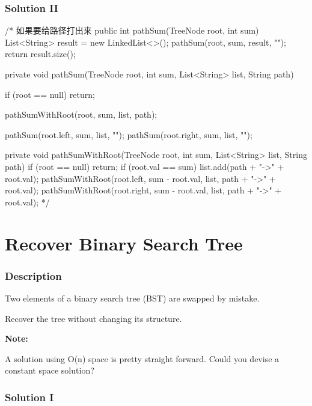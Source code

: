 \newpage

\subsubsection{Solution II}
\begin{Code}
/* 如果要给路径打出来
public int pathSum(TreeNode root, int sum) {
    List<String> result = new LinkedList<>();
    pathSum(root, sum, result, "");
    return result.size();
}

private void pathSum(TreeNode root, int sum, List<String> list, String path) {
    if (root == null) {
        return;
    }

    pathSumWithRoot(root, sum, list, path);

    pathSum(root.left, sum, list, "");
    pathSum(root.right, sum, list, "");
}

private void pathSumWithRoot(TreeNode root, int sum, List<String> list, String path) {
    if (root == null) {
        return;
    }
    if (root.val == sum) {
        list.add(path + "->" + root.val);
    }
    pathSumWithRoot(root.left, sum - root.val, list, path + "->" + root.val);
    pathSumWithRoot(root.right, sum - root.val, list, path + "->" + root.val);
}*/
\end{Code}

\newpage

\section{Recover Binary Search Tree} %

\subsubsection{Description}
Two elements of a binary search tree (BST) are swapped by mistake.

Recover the tree without changing its structure.

\textbf{Note:}

A solution using O(n) space is pretty straight forward. Could you devise a constant space solution?

\subsubsection{Solution I}

